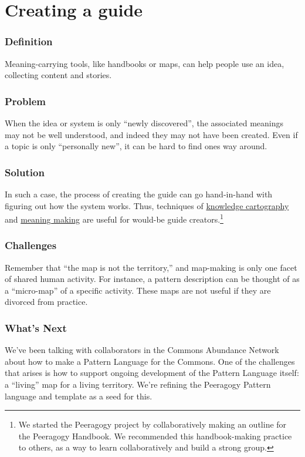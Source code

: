 \section{Creating a guide}\label{sec:Creating_a_guide}
\subsubsection*{Definition} Meaning-carrying tools, like handbooks or maps, can
help people use an idea, collecting content and stories.

\subsubsection*{Problem} When the idea or system is only ``newly discovered'',
the associated meanings may not be well understood, and indeed they may
not have been created. Even if a topic is only ``personally new'', it
can be hard to find ones way around.

\subsubsection*{Solution} In such a case, the process of creating the guide can
go hand-in-hand with figuring out how the system works. Thus, techniques
of \href{http://knowledgecartography.org/}{knowledge cartography}
and \href{http://www.hitl.washington.edu/publications/r-97-47/two.html}{meaning
making} are useful for would-be guide creators.\footnote{We started the Peeragogy project by collaboratively
making an outline for the Peeragogy Handbook. We recommended this
handbook-making practice to others, as a way to learn collaboratively
and build a strong group.}

\subsubsection*{Challenges} Remember that ``the map is not the territory,'' and
map-making is only one facet of shared human activity. For instance, a
pattern description can be thought of as a ``micro-map'' of a specific
activity. These maps are not useful if they are divorced from practice.

\subsubsection*{What's Next} We've been talking with collaborators in the
Commons Abundance Network about how to make a Pattern Language for the
Commons. One of the challenges that arises is how to support ongoing
development of the Pattern Language itself: a ``living'' map for a
living territory. We're refining the Peeragogy Pattern language and
template as a seed for this.
